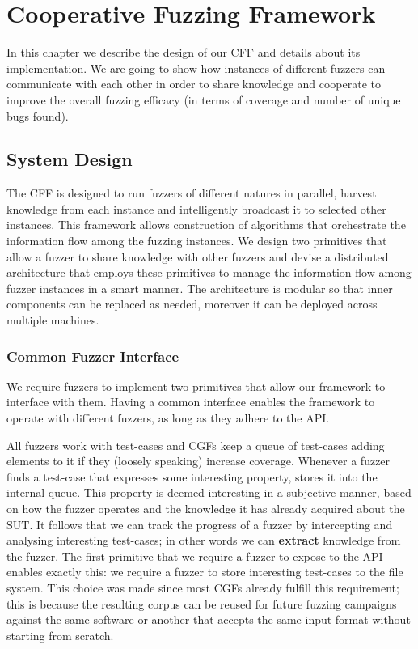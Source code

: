 \chapter{Cooperative Fuzzing Framework}
In this chapter we describe the design of our \acf{CFF} and details about its
implementation. We are going to show how instances of different fuzzers can
communicate with each other in order to share knowledge and cooperate to improve
the overall fuzzing efficacy (in terms of coverage and number of unique bugs
found).

\section{System Design}
The \ac{CFF} is designed to run fuzzers of different
natures in parallel, harvest knowledge from each instance and intelligently
broadcast it to selected other instances. This framework allows construction of
algorithms that orchestrate the information flow among the fuzzing instances. We
design two primitives that allow a fuzzer to share knowledge with other fuzzers
and devise a distributed architecture that employs these primitives to manage
the information flow among fuzzer instances in a smart manner. The architecture
is modular so that inner components can be replaced as needed, moreover it can
be deployed across multiple machines.

\subsection{Common Fuzzer Interface}
\label{sec:system-design-api}
We require fuzzers to implement two primitives that allow our framework to
interface with them. Having a common interface enables the framework to operate
with different fuzzers, as long as they adhere to the \ac{API}.

All fuzzers work with test-cases and \acp{CGF} keep a queue of test-cases adding
elements to it if they (loosely speaking) increase coverage. Whenever a fuzzer
finds a test-case that expresses some interesting property, stores it into the
internal queue. This property is deemed interesting in a subjective manner,
based on how the fuzzer operates and the knowledge it has already acquired about
the \ac{SUT}. It follows that we can track the progress of a fuzzer by
intercepting and analysing interesting test-cases; in other words we can
\textbf{extract} knowledge from the fuzzer. The first primitive that we require
a fuzzer to expose to the \ac{API} enables exactly this: we require a fuzzer to
store interesting test-cases to the file system. This choice was made since most
\acp{CGF} already fulfill this requirement; this is because the resulting corpus
can be reused for future fuzzing campaigns against the same software or another
that accepts the same input format without starting from scratch.

